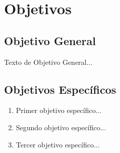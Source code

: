 \section{Objetivos}
\subsection{Objetivo General}

Texto de Objetivo General...

\subsection{Objetivos Específicos}

\begin{enumerate}
    \item Primer objetivo específico...
    
    \item Segundo objetivo específico...
    
    \item Tercer objetivo específico...
\end{enumerate}